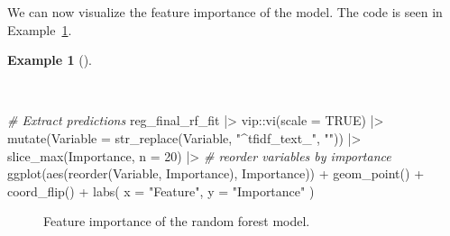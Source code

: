 \documentclass[
  letterpaper,
  DIV=11,
  numbers=noendperiod]{scrreprt}
\newenvironment{Shaded}{\begin{snugshade}}{\end{snugshade}}
\newcommand{\AttributeTok}[1]{\textcolor[rgb]{0.00,0.00,0.00}{#1}}
\newcommand{\CommentTok}[1]{\textcolor[rgb]{0.00,0.00,0.00}{\textit{#1}}}
\newcommand{\ConstantTok}[1]{\textcolor[rgb]{0.00,0.00,0.00}{#1}}
\newcommand{\DecValTok}[1]{\textcolor[rgb]{0.00,0.00,0.00}{#1}}
\newcommand{\FunctionTok}[1]{\textcolor[rgb]{0.00,0.00,0.00}{#1}}
\newcommand{\NormalTok}[1]{\textcolor[rgb]{0.00,0.00,0.00}{#1}}
\newcommand{\SpecialCharTok}[1]{\textcolor[rgb]{0.00,0.00,0.00}{#1}}
\newcommand{\StringTok}[1]{\textcolor[rgb]{0.00,0.00,0.00}{#1}}
\theoremstyle{definition}
\newtheorem{example}{Example}[chapter]
\theoremstyle{remark}
\begin{document}
We can now visualize the feature importance of the model. The code is
seen in
Example~\ref{exm-pda-reg-model-spec-random-forest-workflow-tune-select-fit-evaluate-test-feature-importance}.

\begin{example}[]\protect\hypertarget{exm-pda-reg-model-spec-random-forest-workflow-tune-select-fit-evaluate-test-feature-importance}{}\label{exm-pda-reg-model-spec-random-forest-workflow-tune-select-fit-evaluate-test-feature-importance}

~

\begin{Shaded}
\begin{Highlighting}[]
\CommentTok{\# Extract predictions}
\NormalTok{reg\_final\_rf\_fit }\SpecialCharTok{|\textgreater{}}
\NormalTok{  vip}\SpecialCharTok{::}\FunctionTok{vi}\NormalTok{(}\AttributeTok{scale =} \ConstantTok{TRUE}\NormalTok{)  }\SpecialCharTok{|\textgreater{}}
  \FunctionTok{mutate}\NormalTok{(}\AttributeTok{Variable =} \FunctionTok{str\_replace}\NormalTok{(Variable, }\StringTok{"\^{}tfidf\_text\_"}\NormalTok{, }\StringTok{""}\NormalTok{)) }\SpecialCharTok{|\textgreater{}}
  \FunctionTok{slice\_max}\NormalTok{(Importance, }\AttributeTok{n =} \DecValTok{20}\NormalTok{) }\SpecialCharTok{|\textgreater{}}
  \CommentTok{\# reorder variables by importance}
  \FunctionTok{ggplot}\NormalTok{(}\FunctionTok{aes}\NormalTok{(}\FunctionTok{reorder}\NormalTok{(Variable, Importance), Importance)) }\SpecialCharTok{+}
  \FunctionTok{geom\_point}\NormalTok{() }\SpecialCharTok{+}
  \FunctionTok{coord\_flip}\NormalTok{() }\SpecialCharTok{+}
  \FunctionTok{labs}\NormalTok{(}
    \AttributeTok{x =} \StringTok{"Feature"}\NormalTok{,}
    \AttributeTok{y =} \StringTok{"Importance"}
\NormalTok{  )}
\end{Highlighting}
\end{Shaded}

\begin{figure}[H]


\caption{\label{fig-pda-reg-model-spec-random-forest-workflow-tune-select-fit-evaluate-test-feature-importance}Feature
importance of the random forest model.}

\end{figure}%

\end{example}
\end{document}
